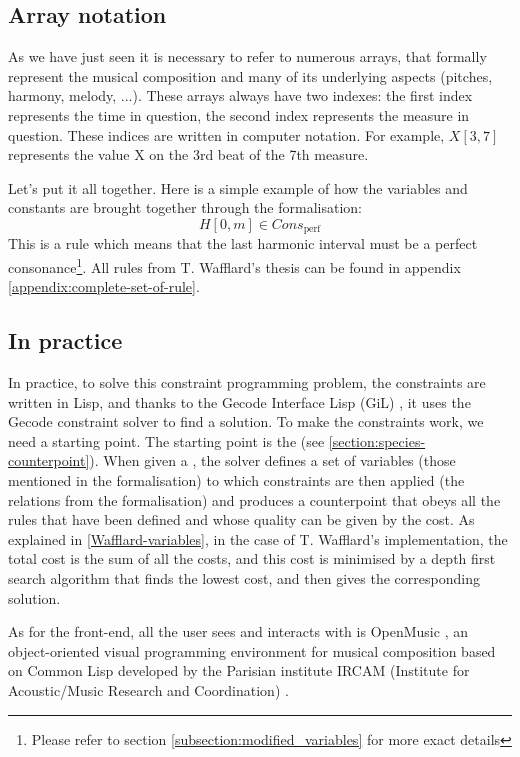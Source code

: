 \subsection{Array notation}
As we have just seen it is necessary to refer to numerous arrays, that formally represent the musical composition and many of its underlying aspects (pitches, harmony, melody, ...). These arrays always have two indexes: the first index represents the time in question, the second index represents the measure in question. These indices are written in computer notation. For example, $X[3, 7]$ represents the value X on the 3rd beat of the 7th measure.

Let's put it all together. Here is a simple example of how the variables and constants are brought together through the formalisation: 
\begin{equation}    
    H[0, m] \in Cons_{\text{perf}}
\end{equation}
 This is a rule which means that the last harmonic interval must be a perfect consonance\footnote{Please refer to section \ref{subsection:modified_variables} for more exact details}. All rules from T. Wafflard's thesis can be found in appendix \ref{appendix:complete-set-of-rule}.



\subsection{In practice}
In practice, to solve this constraint programming problem, the constraints are written in Lisp, and thanks to the Gecode Interface Lisp (GiL) \cite{GiL}, it uses the Gecode constraint solver \cite{Gecode} to find a solution. To make the constraints work, we need a starting point. The starting point is the \cf (see \ref{section:species-counterpoint}).
When given a \cf, the solver defines a set of variables (those mentioned in the formalisation) to which constraints are then applied (the relations from the formalisation) and produces a counterpoint that obeys all the rules that have been defined and whose quality can be given by the cost. As explained in \ref{Wafflard-variables}, in the case of T. Wafflard's implementation, the total cost is the sum of all the costs, and this cost is minimised by a depth first search algorithm that finds the lowest cost, and then gives the corresponding solution.


As for the front-end, all the user sees and interacts with is OpenMusic \cite{OpenMusic}, an object-oriented visual programming environment for musical composition based on Common Lisp \cite{commonlisp} developed by the Parisian institute IRCAM (Institute for Acoustic/Music Research and Coordination) \cite{IRCAM}.

